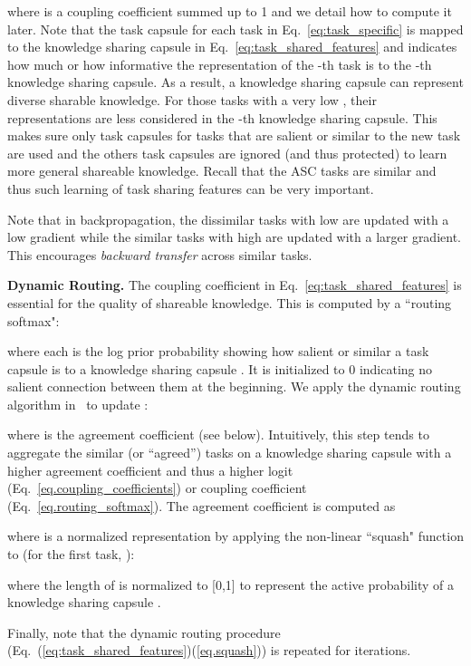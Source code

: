 \documentclass[11pt]{article}
\begin{document}
where  is a coupling coefficient summed up to 1 and we detail how to compute it later.
Note that the task capsule for each task in Eq.~\ref{eq:task_specific} is mapped to the knowledge sharing capsule in Eq.~\ref{eq:task_shared_features} and  indicates how much or how informative the representation of the -th task is to the -th knowledge sharing capsule.
As a result, a knowledge sharing capsule can represent diverse sharable knowledge.
For those tasks with a very low , their representations are less considered in the -th knowledge sharing capsule. 
This makes sure only task capsules for tasks that are salient or similar to the new task are used and the others task capsules are ignored (and thus protected) to learn more general shareable knowledge.
Recall that the ASC tasks are similar and thus such learning of task sharing features can be very important. 

Note that in backpropagation, the dissimilar tasks with low  are updated with a low gradient while the similar tasks with high  are updated with a larger gradient. This encourages \textit{backward transfer} across similar tasks.


\textbf{Dynamic Routing.}
The coupling coefficient in Eq.~\ref{eq:task_shared_features} is essential for the quality of shareable knowledge.
This is computed by a ``routing softmax":
\vspace{-1.5mm}

where each  is the log prior probability showing how salient or similar a task capsule  is to a knowledge sharing capsule . It is initialized to 0 indicating no salient connection between them  at the beginning.
We apply the dynamic routing algorithm in~\cite{sabour2017dynamic} to update :

where  is the agreement coefficient (see below).
Intuitively, this step tends to aggregate the similar (or ``agreed'') tasks on a knowledge sharing capsule 
with a higher agreement coefficient  
and thus a higher logit  (Eq.~\ref{eq.coupling_coefficients})
or coupling coefficient  (Eq.~\ref{eq.routing_softmax}).
The agreement coefficient is computed as 

where  is a normalized representation by applying the non-linear ``squash" function \cite{sabour2017dynamic} to  (for the first task, ):
\vspace{-1.5mm}

where the length of  is normalized to [0,1] to represent the active probability of a knowledge sharing capsule . 

Finally, note that the dynamic routing procedure (Eq.~(\ref{eq:task_shared_features})(\ref{eq.squash}))
is repeated for  iterations.
\end{document}
